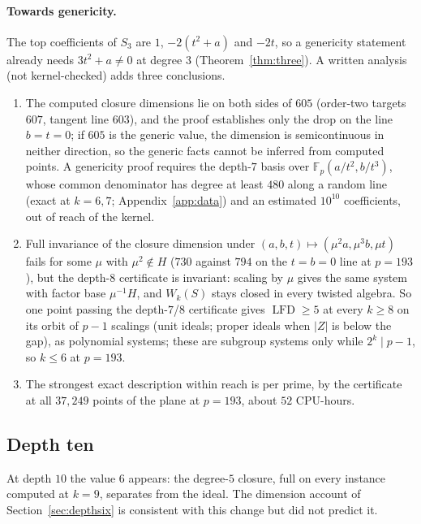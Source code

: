 \documentclass[11pt]{article}
\theoremstyle{definition}\newtheorem{definition}[theorem]{Definition}
\theoremstyle{remark}\newtheorem{remark}[theorem]{Remark}
\newcommand{\F}{\mathbb F}
\newcommand{\lfd}{\operatorname{LFD}}
\begin{document}
\paragraph{Towards genericity.} The top coefficients of $S_3$ are $1$,
$-2(t^2+a)$ and $-2t$, so a genericity statement already needs $3t^2+a\ne0$
at degree $3$ (Theorem~\ref{thm:three}). A written analysis (not
kernel-checked) adds three conclusions.
\begin{enumerate}
\item The computed closure dimensions lie on both sides of $605$ (order-two
 targets $607$, tangent line $603$), and the proof establishes only the drop
 on the line $b=t=0$; if $605$ is the generic value, the dimension is
 semicontinuous in neither direction, so the generic facts cannot be inferred
 from computed points. A genericity proof requires the depth-$7$ basis over
 $\F_p(a/t^2,b/t^3)$, whose common denominator has degree at least $480$
 along a random line (exact at $k=6,7$; Appendix~\ref{app:data}) and an
 estimated $10^{10}$ coefficients, out of reach of the kernel.
\item Full invariance of the closure dimension under
 $(a,b,t)\mapsto(\mu^2a,\mu^3b,\mu t)$ fails for some $\mu$ with
 $\mu^2\notin H$ ($730$ against $794$ on the $t=b=0$ line at $p=193$), but
 the depth-$8$ certificate is invariant: scaling by $\mu$ gives the same
 system with factor base $\mu^{-1}H$, and $W_k(S)$ stays closed in every
 twisted algebra. So one point passing the depth-$7$/$8$ certificate gives
 $\lfd\ge5$ at every $k\ge8$ on its orbit of $p-1$ scalings (unit ideals;
 proper ideals when $|Z|$ is below the gap), as polynomial systems; these are
 subgroup systems only while $2^k\mid p-1$, so $k\le6$ at $p=193$.
\item The strongest exact description within reach is per prime, by the
 certificate at all $37{,}249$ points of the plane at $p=193$, about $52$
 CPU-hours.
\end{enumerate}

\subsection{Depth ten}\label{sec:depth10}
At depth $10$ the value $6$ appears: the degree-$5$ closure, full on every
instance computed at $k=9$, separates from the ideal. The dimension account
of Section~\ref{sec:depthsix} is consistent with this change but did not
predict it.
\end{document}
